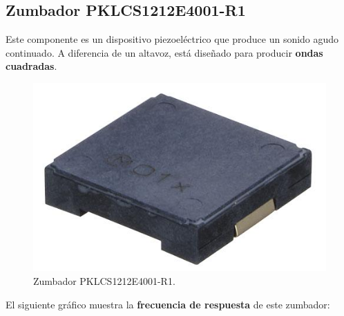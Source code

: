 \subsection{Zumbador PKLCS1212E4001-R1}

Este componente es un dispositivo piezoeléctrico que produce un sonido agudo continuado. A diferencia de un altavoz, está diseñado para producir \textbf{ondas cuadradas}.

\smallskip

\begin{figure}[H]
	\noindent \begin{centering}
		\includegraphics[width=\linewidth/3]{capitulo3/buzzer}
		\par\end{centering}
	\smallskip
	\caption[Zumbador PKLCS1212E4001-R1.]{\label{fig:buzzer} Zumbador PKLCS1212E4001-R1. \cite{buzzer}}
\end{figure} 

\smallskip

El siguiente gráfico muestra la \textbf{frecuencia de respuesta} de este zumbador:

\smallskip

